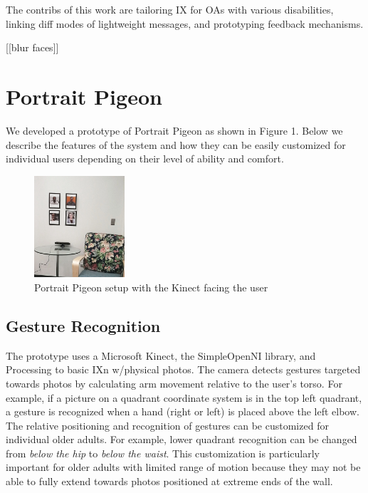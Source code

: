 \documentclass{chi-ext}
\begin{document}
The contribs of this work are tailoring IX for OAs with various disabilities, linking diff modes of lightweight messages, and prototyping feedback mechanisms. 

[[blur faces]]

\section{Portrait Pigeon}
We developed a prototype of Portrait Pigeon as shown in Figure 1. Below we describe the features of the system and how they can be easily customized for individual users depending on their level of ability and comfort.

\begin{figure}
	\centering
	\includegraphics[width=0.3\textwidth]{photo-chair.JPG}
	\caption{Portrait Pigeon setup with the Kinect facing the user}
\end{figure}

\subsection{Gesture Recognition}
The prototype uses a Microsoft Kinect, the SimpleOpenNI library, and Processing to basic IXn w/physical photos. The camera detects gestures targeted towards photos by calculating arm movement relative to the user's torso. For example, if a picture on a quadrant coordinate system is in the top left quadrant, a gesture is recognized when a hand (right or left) is placed above the left elbow. The relative positioning and recognition of gestures can be customized for individual older adults. For example, lower quadrant recognition can be changed from \textit{below the hip} to \textit{below the waist}. This customization is particularly important for older adults with limited range of motion because they may not be able to fully extend towards photos positioned at extreme ends of the wall. 
\end{document}
